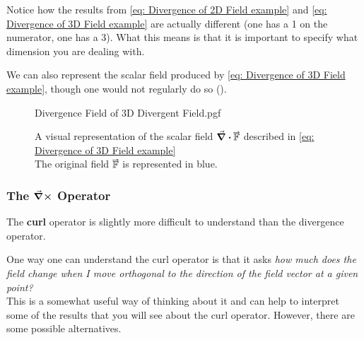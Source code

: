 \documentclass[main.tex]{subfiles}
\begin{document}
                    Notice how the results from \eqref{eq: Divergence of 2D Field example} and \eqref{eq: Divergence of 3D Field example} are actually different (one has a 1 on the numerator, one has a 3).
                    What this means is that it is important to specify what dimension you are dealing with.

        
                    We can also represent the scalar field produced by \eqref{eq: Divergence of 3D Field example}, though one would not regularly do so ().


                    \begin{figure}[h]
                        \centering
                        \scalebox{1.2}
                        {
                            \begin{adjustbox}{clip,trim=20mm 25mm 20mm 20mm}
                                {{Divergence Field of 3D Divergent Field.pgf}}
                            \end{adjustbox}
                        }
                        \captionsetup{singlelinecheck=off}
                        \caption[.]{A visual representation of the scalar field $\protect \div{\vect{\mathbb{F}}}$ described in \eqref{eq: Divergence of 3D Field example}  \\The original field $\vect{\mathbb{F}}$ is represented in blue.}
                        \label{fig: Divergence Field of 3D Divergent Field}
                    \end{figure}
                    \FloatBarrier
                    \vspace{2em}






                \newpage

                \subsubsection{The $\curl{}$ Operator}
                    \label{subsubsec: The Curl Operator}

                    The \textbf{curl} operator is slightly more difficult to understand than the divergence operator.

                    One way one can understand the curl operator is that it asks \textit{how much does the field change when I move orthogonal to the direction of the field vector at a given point?}\\
                    This is a somewhat useful way of thinking about it and can help to interpret some of the results that you will see about the curl operator. However, there are some possible alternatives.
\end{document}
